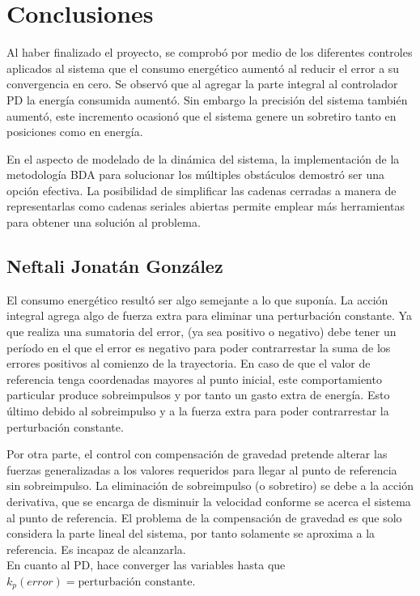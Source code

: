 \section{Conclusiones}
Al haber finalizado el proyecto, se comprobó por medio de los diferentes controles aplicados al sistema que el consumo energético aumentó al reducir el error a su convergencia en cero. 
Se observó que al agregar la parte integral al controlador PD la energía consumida aumentó. Sin embargo la precisión del sistema también aumentó, este incremento ocasionó que el sistema genere un sobretiro tanto en posiciones como en energía.

En el aspecto de modelado de la dinámica del sistema, la implementación de la metodología BDA para solucionar los múltiples obstáculos demostró ser una opción efectiva.
La posibilidad de simplificar las cadenas cerradas a manera de representarlas como cadenas seriales abiertas permite emplear más herramientas para obtener una solución al problema.



\subsection{Neftali Jonatán González}
El consumo energético resultó ser algo semejante a lo que suponía. La acción integral agrega algo de fuerza extra para eliminar una perturbación constante.
Ya que realiza una sumatoria del error, (ya sea positivo o negativo) debe tener un período en el que el error es negativo para poder contrarrestar la suma de los errores positivos al comienzo de la trayectoria.
En caso de que el valor de referencia tenga coordenadas mayores al punto inicial, este comportamiento particular produce sobreimpulsos y por tanto un gasto extra de energía. 
Esto último debido al sobreimpulso y a la fuerza extra para poder contrarrestar la perturbación constante.

Por otra parte, el control con compensación de gravedad pretende alterar las fuerzas generalizadas a los valores requeridos para llegar al punto de referencia sin sobreimpulso.
La eliminación de sobreimpulso (o sobretiro) se debe a la acción derivativa, que se encarga de disminuir la velocidad conforme se acerca el sistema al punto de referencia.
El problema de la compensación de gravedad es que solo considera la parte lineal del sistema, por tanto solamente se aproxima a la referencia. Es incapaz de alcanzarla.\\

En cuanto al PD, hace converger las variables hasta que $k_p\left(error\right) = \text{perturbación constante}$.

